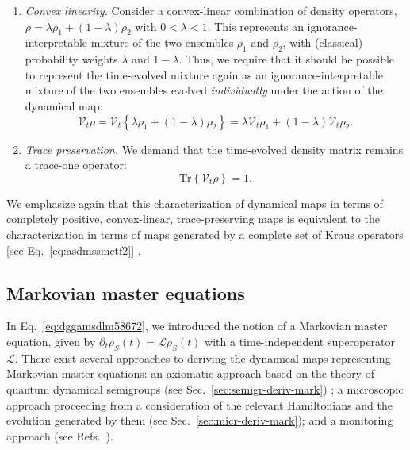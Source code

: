 \documentclass[3p,sort&compress,12pt]{elsarticle}
\newcommand{\op}[1]{#1}
\begin{document}
\begin{enumerate}
\item \emph{Convex linearity.} Consider a convex-linear combination of density operators, $\op{\rho} = \lambda \op{\rho}_1 + (1-\lambda) \op{\rho}_2$ with $0 < \lambda < 1$. This represents an ignorance-interpretable mixture of the two ensembles $\op{\rho}_1$ and $\op{\rho}_2$, with (classical) probability weights $\lambda$ and $1-\lambda$. Thus, we require that it should be possible to represent the time-evolved mixture again as an ignorance-interpretable mixture of the two ensembles evolved \emph{individually} under the action of the dynamical map:
%
\begin{equation}
  \label{eq:cl}
\mathcal{V}_t \op{\rho} = \mathcal{V}_t \left\{ \lambda \op{\rho}_1 + (1-\lambda) \op{\rho}_2\right\} = \lambda \mathcal{V}_t\op{\rho}_1 + (1-\lambda) \mathcal{V}_t\op{\rho}_2.
\end{equation}
%

\item \emph{Trace preservation.} We demand that the time-evolved density matrix remains a trace-one operator:
%
\begin{equation}
  \label{eq:t78sccl}
\text{Tr} \left\{ \mathcal{V}_t \op{\rho} \right\} =1.
\end{equation}
%

\end{enumerate}

We emphasize again that this characterization of dynamical maps in terms of completely positive, convex-linear, trace-preserving maps is equivalent to the characterization in terms of maps generated by a complete set of Kraus operators [see Eq.~\eqref{eq:asdmssmetf2}] \cite{Kraus:1983:ee}.

\subsection{Markovian master equations}

In Eq.~\eqref{eq:dggamsdlm58672}, we introduced the notion of a Markovian master equation, given by $\partial_t \op{\rho}_S(t) = \mathcal{L}\op{\rho}_S(t)$ with a time-independent superoperator $\mathcal{L}$. There exist several approaches to deriving the dynamical maps representing Markovian master equations: an axiomatic approach based on the theory of quantum dynamical semigroups (see Sec.~\ref{sec:semigr-deriv-mark}) \cite{Lindblad:1976:um,Gorini:1976:tt,Gorini:1978:uf,Davies:1974:tw,Kossakowski:1972:tf,Alicki:2007:uu}; a microscopic approach proceeding from a consideration of the relevant Hamiltonians and the evolution generated by them (see Sec.~\ref{sec:micr-deriv-mark}); and a monitoring approach (see Refs.~\cite{Hornberger:2006:tc,Hornberger:2008:ii}).
\end{document}
